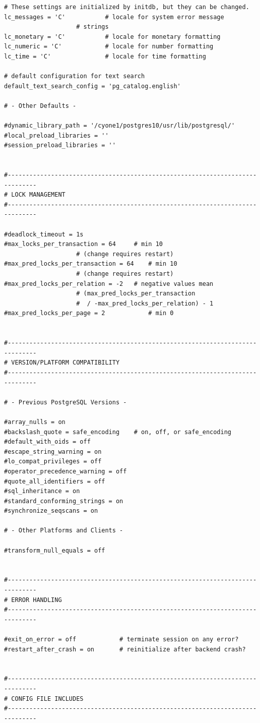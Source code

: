 \begin{verbatim}
# These settings are initialized by initdb, but they can be changed.
lc_messages = 'C'			# locale for system error message
					# strings
lc_monetary = 'C'			# locale for monetary formatting
lc_numeric = 'C'			# locale for number formatting
lc_time = 'C'				# locale for time formatting

# default configuration for text search
default_text_search_config = 'pg_catalog.english'

# - Other Defaults -

#dynamic_library_path = '/cyone1/postgres10/usr/lib/postgresql/'
#local_preload_libraries = ''
#session_preload_libraries = ''


#------------------------------------------------------------------------------
# LOCK MANAGEMENT
#------------------------------------------------------------------------------

#deadlock_timeout = 1s
#max_locks_per_transaction = 64		# min 10
					# (change requires restart)
#max_pred_locks_per_transaction = 64	# min 10
					# (change requires restart)
#max_pred_locks_per_relation = -2	# negative values mean
					# (max_pred_locks_per_transaction
					#  / -max_pred_locks_per_relation) - 1
#max_pred_locks_per_page = 2            # min 0


#------------------------------------------------------------------------------
# VERSION/PLATFORM COMPATIBILITY
#------------------------------------------------------------------------------

# - Previous PostgreSQL Versions -

#array_nulls = on
#backslash_quote = safe_encoding	# on, off, or safe_encoding
#default_with_oids = off
#escape_string_warning = on
#lo_compat_privileges = off
#operator_precedence_warning = off
#quote_all_identifiers = off
#sql_inheritance = on
#standard_conforming_strings = on
#synchronize_seqscans = on

# - Other Platforms and Clients -

#transform_null_equals = off


#------------------------------------------------------------------------------
# ERROR HANDLING
#------------------------------------------------------------------------------

#exit_on_error = off			# terminate session on any error?
#restart_after_crash = on		# reinitialize after backend crash?


#------------------------------------------------------------------------------
# CONFIG FILE INCLUDES
#------------------------------------------------------------------------------


\end{verbatim}

